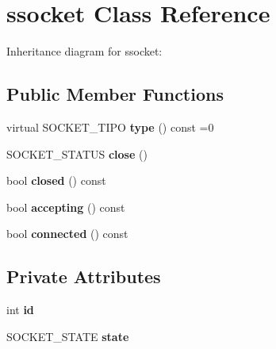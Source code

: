\hypertarget{classssocket}{}\section{ssocket Class Reference}
\label{classssocket}


Inheritance diagram for ssocket\+:
\subsection*{Public Member Functions}
\begin{DoxyCompactItemize}
\item 
virtual S\+O\+C\+K\+E\+T\+\_\+\+T\+I\+PO {\bfseries type} () const =0\hypertarget{classssocket_a839b6cdcc0e9a3d646d04155515dfce9}{}\label{classssocket_a839b6cdcc0e9a3d646d04155515dfce9}

\item 
S\+O\+C\+K\+E\+T\+\_\+\+S\+T\+A\+T\+US {\bfseries close} ()\hypertarget{classssocket_ab2d17f0e48d311372cd2e562e39ba27c}{}\label{classssocket_ab2d17f0e48d311372cd2e562e39ba27c}

\item 
bool {\bfseries closed} () const \hypertarget{classssocket_a5ac9c60bd09eb19970d0ef59bf47133a}{}\label{classssocket_a5ac9c60bd09eb19970d0ef59bf47133a}

\item 
bool {\bfseries accepting} () const \hypertarget{classssocket_ac7d344991ec98e45ea7d55b26c7877b5}{}\label{classssocket_ac7d344991ec98e45ea7d55b26c7877b5}

\item 
bool {\bfseries connected} () const \hypertarget{classssocket_a7294c14f0b87f9a5c239e6704dd6f9c1}{}\label{classssocket_a7294c14f0b87f9a5c239e6704dd6f9c1}

\end{DoxyCompactItemize}
\subsection*{Private Attributes}
\begin{DoxyCompactItemize}
\item 
int {\bfseries id}\hypertarget{classssocket_acb5fcc89764b41c1fdb2530d475b8cef}{}\label{classssocket_acb5fcc89764b41c1fdb2530d475b8cef}

\item 
S\+O\+C\+K\+E\+T\+\_\+\+S\+T\+A\+TE {\bfseries state}\hypertarget{classssocket_ab8977dc051d8b2e8ef8f097d22516538}{}\label{classssocket_ab8977dc051d8b2e8ef8f097d22516538}

\end{DoxyCompactItemize}
